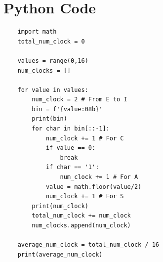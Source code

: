 \documentclass[11pt]{article}
\begin{document}
\pagebreak
\appendix
\section{Python Code}
\begin{lstlisting}
    import math
    total_num_clock = 0
    
    values = range(0,16)
    num_clocks = []
    
    for value in values:
        num_clock = 2 # From E to I
        bin = f'{value:08b}'
        print(bin)
        for char in bin[::-1]:
            num_clock += 1 # For C
            if value == 0:
                break
            if char == '1':
                num_clock += 1 # For A
            value = math.floor(value/2)
            num_clock += 1 # For S
        print(num_clock)
        total_num_clock += num_clock
        num_clocks.append(num_clock)
    
    average_num_clock = total_num_clock / 16
    print(average_num_clock)
\end{lstlisting}

\pagebreak
\printbibliography
\end{document}
